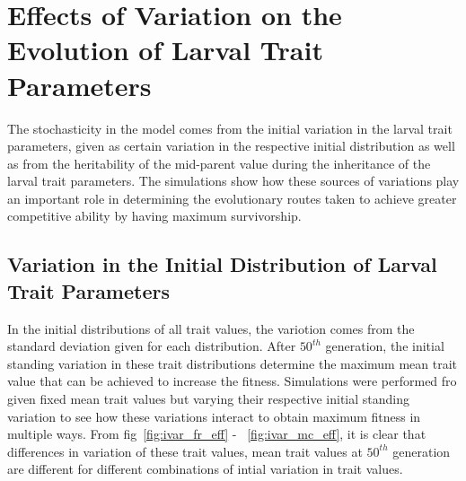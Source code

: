 \chapter{Effects of Variation on the Evolution of Larval Trait Parameters}
The stochasticity in the model comes from the initial variation in the larval trait parameters, given as certain variation in the respective initial distribution as well as from the heritability of the mid-parent value during the inheritance of the larval trait parameters. The simulations show how these sources of variations play an important role in determining the evolutionary routes taken to achieve greater competitive ability by having maximum survivorship.
\section{Variation in the Initial Distribution of Larval Trait Parameters}
In the initial distributions of all trait values, the variotion comes from the standard deviation given for each distribution. After $50^{th}$ generation, the initial standing variation in these trait distributions determine the maximum mean trait value that can be achieved to increase the fitness. Simulations were performed fro given fixed mean trait values but varying their respective initial standing variation to see how these variations interact to obtain maximum fitness in multiple ways. From fig~\ref{fig:ivar_fr_eff} - ~\ref{fig:ivar_mc_eff}, it is clear that differences in variation of these trait values, mean trait values at $50^{th}$ generation are different for different combinations of intial variation in trait values.\\\\

